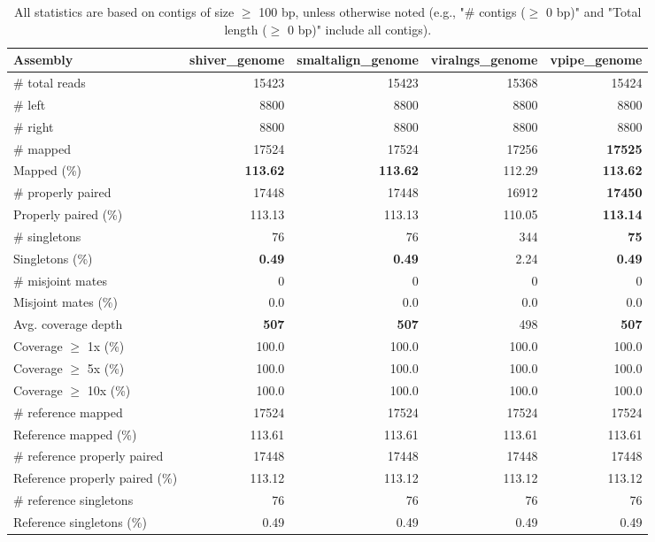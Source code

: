 \documentclass[12pt,a4paper]{article}
\begin{document}
\begin{table}[ht]
\begin{center}
\caption{All statistics are based on contigs of size $\geq$ 100 bp, unless otherwise noted (e.g., "\# contigs ($\geq$ 0 bp)" and "Total length ($\geq$ 0 bp)" include all contigs).}
\begin{tabular}{|l*{4}{|r}|}
\hline
Assembly & shiver\_genome & smaltalign\_genome & viralngs\_genome & vpipe\_genome \\ \hline
\# total reads & 15423 & 15423 & 15368 & 15424 \\ \hline
\# left & 8800 & 8800 & 8800 & 8800 \\ \hline
\# right & 8800 & 8800 & 8800 & 8800 \\ \hline
\# mapped & 17524 & 17524 & 17256 & {\bf 17525} \\ \hline
Mapped (\%) & {\bf 113.62} & {\bf 113.62} & 112.29 & {\bf 113.62} \\ \hline
\# properly paired & 17448 & 17448 & 16912 & {\bf 17450} \\ \hline
Properly paired (\%) & 113.13 & 113.13 & 110.05 & {\bf 113.14} \\ \hline
\# singletons & 76 & 76 & 344 & {\bf 75} \\ \hline
Singletons (\%) & {\bf 0.49} & {\bf 0.49} & 2.24 & {\bf 0.49} \\ \hline
\# misjoint mates & 0 & 0 & 0 & 0 \\ \hline
Misjoint mates (\%) & 0.0 & 0.0 & 0.0 & 0.0 \\ \hline
Avg. coverage depth & {\bf 507} & {\bf 507} & 498 & {\bf 507} \\ \hline
Coverage $\geq$ 1x (\%) & 100.0 & 100.0 & 100.0 & 100.0 \\ \hline
Coverage $\geq$ 5x (\%) & 100.0 & 100.0 & 100.0 & 100.0 \\ \hline
Coverage $\geq$ 10x (\%) & 100.0 & 100.0 & 100.0 & 100.0 \\ \hline
\# reference mapped & 17524 & 17524 & 17524 & 17524 \\ \hline
Reference mapped (\%) & 113.61 & 113.61 & 113.61 & 113.61 \\ \hline
\# reference properly paired & 17448 & 17448 & 17448 & 17448 \\ \hline
Reference properly paired (\%) & 113.12 & 113.12 & 113.12 & 113.12 \\ \hline
\# reference singletons & 76 & 76 & 76 & 76 \\ \hline
Reference singletons (\%) & 0.49 & 0.49 & 0.49 & 0.49 \\ \hline

\end{tabular}
\end{center}
\end{table}
\end{document}
